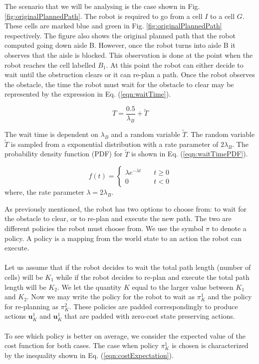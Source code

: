 \documentclass[a4paper,12pt]{article}
\begin{document}
			The scenario that we will be analysing is the case shown in Fig. \ref{fig:originalPlannedPath}. The robot is required to go from a cell $I$ to a cell $G$. These cells are marked blue and green in Fig. \ref{fig:originalPlannedPath} respectively. The figure also shows the original planned path that the robot computed going down aisle B. However, once the robot turns into aisle B it observes that the aisle is blocked. This observation is done at the point when the robot reaches the cell labelled $B_{1}$. At this point the robot can either decide to wait until the obstruction clears or it can re-plan a path. Once the robot observes the obstacle, the time the robot must wait for the obstacle to clear may be represented by the expression in Eq. (\ref{eqn:waitTime}). 
			
			\begin{equation}
			T=\frac{0.5}{\lambda_{B}}+\widetilde{T}
			\label{eqn:waitTime}
			\end{equation}
			
			The wait time is dependent on $\lambda_{B}$ and a random variable $\widetilde{T}$. The random variable $\widetilde{T}$ is sampled from a exponential distribution with a rate parameter of $2\lambda_{B}$. The probability density function (PDF) for $\widetilde{T}$ is shown in Eq. (\ref{eqn:waitTimePDF}). 
			
			\begin{equation}
			f(t) = 
			\begin{cases}
			\lambda e^{-\lambda t} & \quad t \geq 0 \\
			0 & \quad t < 0
			\end{cases}
			\label{eqn:waitTimePDF}
			\end{equation}
			where, the rate parameter $\lambda = 2\lambda_{B}$. 
			
			As previously mentioned, the robot has two options to choose from: to wait for the obstacle to clear, or to re-plan and execute the new path. The two are different policies the robot must choose from. We use the symbol $\pi$ to denote a policy. A policy is a mapping from the world state to an action the robot can execute.
			\\
			\\
			Let us assume that if the robot decides to wait the total path length (number of cells) will be $K_1$ while if the robot decides to re-plan and execute the total path length will be $K_2$. We let the quantity $K$ equal to the larger value between $K_1$ and $K_2$. Now we may write the policy for the robot to wait as $\pi_{K}^{1}$ and the policy for re-planning as $\pi_{K}^{2}$. These policies are padded correspondingly to produce actions $\textbf{u}_{K}^{1}$ and $\textbf{u}_{K}^{1}$ that are padded with zero-cost state preserving actions.
			\\
			\\
			To see which policy is better on average, we consider the expected value of the cost function for both cases. The case when policy $\pi_{K}^{1}$ is chosen is characterized by the inequality shown in Eq. (\ref{eqn:costExpectation}).
			
\end{document}
